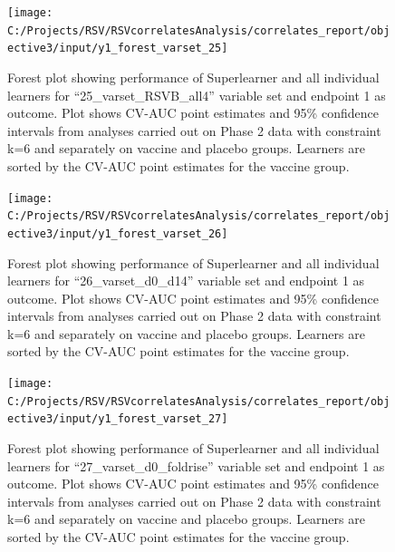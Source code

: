 \documentclass[11pt]{article}
\begin{document}
\begin{figure}[H]

{\centering \texttt{[image: C:/Projects/RSV/RSVcorrelatesAnalysis/correlates\_report/objective3/input/y1\_forest\_varset\_25]} 

}

\caption[Forest plot for ``25\_varset\_RSVB\_all4'' variable set, endpoint 1.]{Forest plot showing performance of Superlearner and all individual learners for ``25\_varset\_RSVB\_all4'' variable set and endpoint 1 as outcome. Plot shows CV-AUC point estimates and 95\% confidence intervals from analyses carried out on Phase 2 data with constraint k=6 and separately on vaccine and placebo groups. Learners are sorted by the CV-AUC point estimates for the vaccine group.}\label{fig:y1-forest-varset-25}
\end{figure}

\begin{figure}[H]

{\centering \texttt{[image: C:/Projects/RSV/RSVcorrelatesAnalysis/correlates\_report/objective3/input/y1\_forest\_varset\_26]} 

}

\caption[Forest plot for ``26\_varset\_d0\_d14'' variable set, endpoint 1.]{Forest plot showing performance of Superlearner and all individual learners for ``26\_varset\_d0\_d14'' variable set and endpoint 1 as outcome. Plot shows CV-AUC point estimates and 95\% confidence intervals from analyses carried out on Phase 2 data with constraint k=6 and separately on vaccine and placebo groups. Learners are sorted by the CV-AUC point estimates for the vaccine group.}\label{fig:y1-forest-varset-26}
\end{figure}

\begin{figure}[H]

{\centering \texttt{[image: C:/Projects/RSV/RSVcorrelatesAnalysis/correlates\_report/objective3/input/y1\_forest\_varset\_27]} 

}

\caption[Forest plot for ``27\_varset\_d0\_foldrise'' variable set, endpoint 1.]{Forest plot showing performance of Superlearner and all individual learners for ``27\_varset\_d0\_foldrise'' variable set and endpoint 1 as outcome. Plot shows CV-AUC point estimates and 95\% confidence intervals from analyses carried out on Phase 2 data with constraint k=6 and separately on vaccine and placebo groups. Learners are sorted by the CV-AUC point estimates for the vaccine group.}\label{fig:y1-forest-varset-27}
\end{figure}
\end{document}
